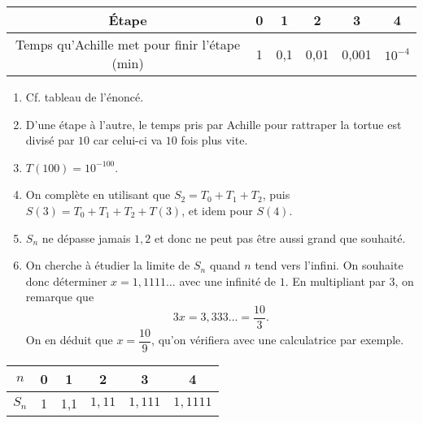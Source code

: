 {			\begin{center}
			\begin{tabular}{|c|c|c|c|c|c|}\hline
				Étape & 0 & 1 & 2 & 3 & 4 \\ \hline
				Temps qu'Achille met pour finir l'étape (min) & 1 & 0,1 & \color{red} 0,01 & \color{red} 0,001 & \color{red} $10^{-4}$ \\ \hline
			\end{tabular}
			\end{center}
			
	\begin{enumerate}
		\item Cf. tableau de l'énoncé.
		\item D'une étape à l'autre, le temps pris par Achille pour rattraper la tortue est divisé par $10$ car celui-ci va $10$ fois plus vite.
		\item $T(100) = 10^{-100}$.
		\item On complète en utilisant que $S_2 = T_0 + T_1 + T_2$, puis $S(3) = T_0 + T_1 + T_2 + T(3)$, et idem pour $S(4)$.
		\item 
		$S_n$ ne dépasse jamais $1,2$ et donc ne peut pas être aussi grand que souhaité.
		\item 
		On cherche à étudier la limite de $S_n$ quand $n$ tend vers l'infini.
		On souhaite donc déterminer $x = 1,1111\dots$ avec une infinité de $1$.
		En multipliant par $3$, on remarque que
			\[ 3x = 3,333\dots = \dfrac{10}3. \]
		On en déduit que $x= \dfrac{10}9$, qu'on vérifiera avec une calculatrice par exemple.
	\end{enumerate}

			\begin{center}
			\begin{tabular}{|c|c|c|c|c|c|}\hline
				$n$ & 0 & 1 & 2 & 3 & 4 \\ \hline
				$S_n$ & 1 & 1,1 & \color{red} $1,11$  & \color{red} $1,111$ &\color{red} $1,1111$ \\ \hline
			\end{tabular}
			\end{center}
}



